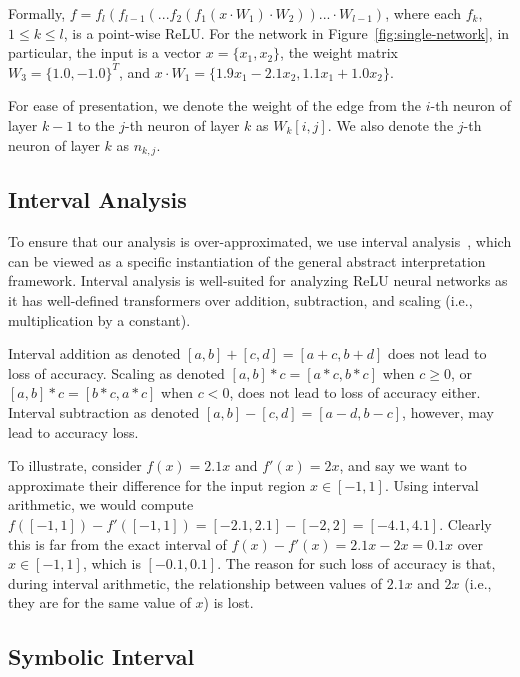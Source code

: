 Formally, $ f = f_l( f_{l-1} (... f_2( f_1(x \cdot W_1) \cdot W_2 ))
... \cdot W_{l-1}) $, where each $ f_k $, $1\leq k \leq l$, is a
point-wise ReLU.
For the network in Figure~\ref{fig:single-network}, in particular, the
input is a vector $x = \{x_1,x_2\}$, the weight matrix $W_3 = \{ 1.0,
-1.0 \}^T$, and $x \cdot W_1 = \{ 1.9 x_1 -2.1 x_2, 1.1 x_1 + 1.0
x_2 \}$.




For ease of presentation, we denote the weight of the edge from
the $i$-th neuron of layer $ k - 1 $ to the $j$-th neuron of layer $ k
$ as $ W_k[i,j] $. We also denote the $j$-th neuron of layer $ k $ as
$ n_{k,j} $.





\subsection{Interval Analysis}
\label{sec:int_analysis}
To ensure that our analysis is over-approximated, we use interval
analysis~\cite{moore2009introduction}, which can be viewed as a
specific instantiation of the general abstract
interpretation~\cite{CousotC77} framework.
Interval analysis is well-suited for analyzing ReLU neural networks as
it has well-defined transformers over addition, subtraction, and
scaling (i.e., multiplication by a constant).

Interval addition as denoted $[a,b] + [c,d] = [a+c, b+d]$
does not lead to loss of accuracy.
%
Scaling as denoted $[a,b] * c = [a*c, b*c]$ when $c\geq 0$, or
$[a,b]*c = [b*c, a*c]$ when $c<0$, does not lead to loss of accuracy either.
%
Interval subtraction as denoted $[a,b] - [c,d] = [a-d, b-c]$, however,
may lead to accuracy loss.


To illustrate, consider $ f(x) = 2.1x $ and $ f'(x) = 2x $, and say we
want to approximate their difference for the input region $ x\in [-1,1] $. Using
interval arithmetic, we would compute $ f([-1,1]) - f'([-1,1]) =
[-2.1,2.1] - [-2,2] = [-4.1, 4.1] $. Clearly this is far from the
exact interval of $f(x) -f'(x) = 2.1x - 2x = 0.1x$ over $x\in[-1,1]$,
which is $ [-0.1, 0.1] $.
%
The reason for such loss of accuracy is that, during interval
arithmetic, the relationship between values of $2.1x$ and $2x$ (i.e.,
they are for the same value of $x$) is lost.


\subsection{Symbolic Interval}

